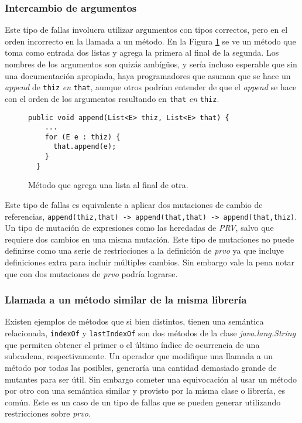 \subsubsection{Intercambio de argumentos}

Este tipo de fallas involucra utilizar argumentos con tipos correctos, pero en el orden incorrecto en la llamada a un m\'etodo. En la Figura \ref{figures.examples.argumentSwap.example1} se ve un m\'etodo que toma como entrada dos listas y agrega la primera al final de la segunda. Los nombres de los argumentos son quiz\'as amb\'ig\"{u}os, y ser\'ia incluso esperable que sin una documentaci\'on apropiada, haya programadores que asuman que se hace un \emph{append} de \texttt{thiz} \emph{en} \texttt{that}, aunque otros podr\'ian entender de que el \emph{append} se hace con el orden de los argumentos resultando en \texttt{that} \emph{en} \texttt{thiz}. 

\begin{figure}
	\begin{lstlisting}[frame=single, mathescape=true,framexleftmargin=1.5em]
  public void append(List<E> thiz, List<E> that) {
    ...
    for (E e : thiz) {
      that.append(e);
    }
  }
	\end{lstlisting}
	\caption{M\'etodo que agrega una lista al final de otra.}
	\label{figures.examples.argumentSwap.example1}
\end{figure}

Este tipo de fallas es equivalente a aplicar dos mutaciones de cambio de referencias, \lstinline|append(thiz,that) -> append(that,that) -> append(that,thiz)|. Un tipo de mutaci\'on de expresiones como las heredadas de \emph{PRV}, salvo que requiere dos cambios en una misma mutaci\'on. Este tipo de mutaciones no puede definirse como una serie de restricciones a la definici\'on de \emph{prvo} ya que incluye definiciones extra para incluir m\'ultiples cambios. Sin embargo vale la pena notar que con dos mutaciones de \emph{prvo} podr\'ia lograrse.

\subsubsection{Llamada a un m\'etodo similar de la misma librer\'ia}

Existen ejemplos de m\'etodos que si bien distintos, tienen una sem\'antica relacionada, \texttt{indexOf} y \texttt{lastIndexOf} son dos m\'etodos de la clase \emph{java.lang.String} que permiten obtener el primer o el \'ultimo \'indice de ocurrencia de una subcadena, respectivamente. Un operador que modifique una llamada a un m\'etodo por todas las posibles, generar\'ia una cantidad demasiado grande de mutantes para ser \'util. Sin embargo cometer una equivocaci\'on al usar un m\'etodo por otro con una sem\'antica similar y provisto por la misma clase o librer\'ia, es com\'un. Este es un caso de un tipo de fallas que se pueden generar utilizando restricciones sobre \emph{prvo}.

